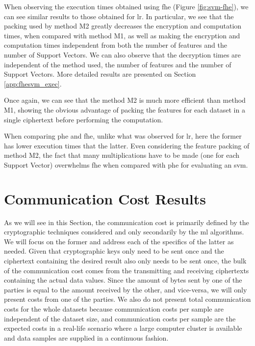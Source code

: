 When observing the execution times obtained using \ac{fhe} (Figure \ref{fig:svm-fhe}), we can see similar results to those obtained for \ac{lr}. In particular, we see that the packing used by method M2 greatly decreases the encryption and computation times, when compared with method M1, as well as making the encryption and computation times independent from both the number of features and the number of Support Vectors. 
We can also observe that the decryption times are independent of the method used, the number of features and the number of Support Vectors. More detailed results are presented on Section \ref{app:fhesvm_exec}.

Once again, we can see that the method M2 is much more efficient than method M1, showing the obvious advantage of packing the features for each dataset in a single ciphertext before performing the computation. 

When comparing \ac{phe} and \ac{fhe}, unlike what was observed for \ac{lr}, here the former has lower execution times that the latter. Even considering the feature packing of method M2, the fact that many multiplications have to be made (one for each Support Vector) overwhelms \ac{fhe} when compared with \ac{phe} for evaluating an \ac{svm}.



\section{Communication Cost Results}
\label{sec:CommunicationCosts}

As we will see in this Section, the communication cost is primarily defined by the cryptographic techniques considered and only secondarily by the \ac{ml} algorithms. We will focus on the former and address each of the specifics of the latter as needed. Given that cryptographic keys only need to be sent once and the ciphertext containing the desired result also only needs to be sent once, the bulk of the communication cost comes from the transmitting and receiving ciphertexts containing the actual data values. Since the amount of bytes sent by one of the parties is equal to the amount received by the other, and vice-versa, we will only present costs from one of the parties. We also do not present total communication costs for the whole datasets because communication costs per sample are independent of the dataset size, and communication costs per sample are the expected costs in a real-life scenario where a large computer cluster is available and data samples are supplied in a continuous fashion.


